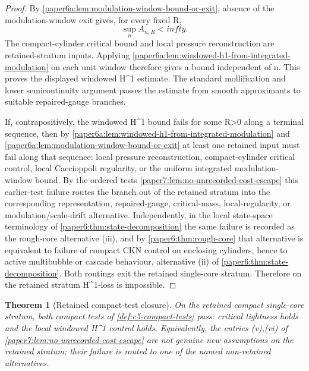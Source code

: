 \documentclass[11pt]{amsart}
\def\({}%
\def\){}%
\def\infty{infty}%
\theoremstyle{plain}
\newtheorem{theorem}{Theorem}[section]
\theoremstyle{definition}
\theoremstyle{remark}
\begin{document}
\begin{proof}
By \cref{paper6a:lem:modulation-window-bound-or-exit}, absence of the
modulation-window exit gives, for every fixed \(R\),
\[
  \sup_n A_{n,R}<\infty .
\]
The compact-cylinder critical bound and local pressure reconstruction are
retained-stratum inputs.  Applying
\cref{paper6a:lem:windowed-h1-from-integrated-modulation} on each unit window
therefore gives a bound independent of \(n\).  This proves the displayed
windowed \(H^1\) estimate.  The standard mollification and lower
semicontinuity argument passes the estimate from smooth approximants to
suitable repaired-gauge branches.

If, contrapositively, the windowed \(H^1\) bound fails for some \(R>0\)
along a terminal sequence, then by
\cref{paper6a:lem:windowed-h1-from-integrated-modulation} and
\cref{paper6a:lem:modulation-window-bound-or-exit} at least one retained input
must fail along that sequence: local pressure reconstruction, compact-cylinder
critical control, local Caccioppoli regularity, or the uniform integrated
modulation-window bound.  By the ordered tests
\cref{paper7:lem:no-unrecorded-cost-escape} this earlier-test failure
routes the branch out of the retained stratum into the corresponding
representation, repaired-gauge, critical-mass, local-regularity, or
modulation/scale-drift alternative.  Independently, in the local state-space
terminology of
\cref{paper6:thm:state-decomposition} the same failure is recorded as
the rough-core alternative \textup{(iii)}, and by
\cref{paper6:thm:rough-core} that alternative is equivalent to failure
of compact CKN control on enclosing cylinders, hence to active
multibubble or cascade behaviour, alternative \textup{(ii)} of
\cref{paper6:thm:state-decomposition}.  Both routings exit the retained
single-core stratum.  Therefore on the retained stratum
\(H^1\)-loss is impossible.
\end{proof}

\begin{theorem}[Retained compact-test closure]
\label{paper6a:thm:retained-compact-tests-closed}
On the retained compact single-core stratum, both compact tests of
\cref{def:c5-compact-tests} pass: critical tightness holds and the local
windowed \(H^1\) control holds.  Equivalently, the entries
\textup{(v),(vi)} of \cref{paper7:lem:no-unrecorded-cost-escape} are not
genuine new assumptions on the retained stratum; their failure is routed
to one of the named non-retained alternatives.
\end{theorem}
\end{document}
